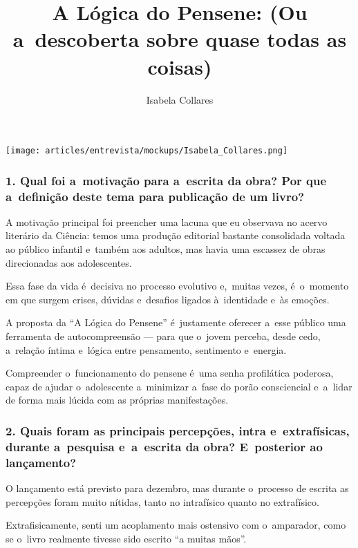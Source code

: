\documentclass{gescons}
\author{Isabela Collares}
\title{A Lógica do Pensene: (Ou a~descoberta sobre quase todas as coisas)}
\begin{document}
    \makeentrevistatitle

    \begin{multicols}{3}

\begin{center}
    \texttt{[image: articles/entrevista/mockups/Isabela\_Collares.png]}
\end{center}
\vspace{-1cm}


\subsubsection{1. Qual foi a~motivação para a~escrita da obra? Por que a~definição deste tema para publicação de um livro?}

\sloppy

A motivação principal foi preencher uma lacuna que eu observava no acervo literário da Ciência: temos uma produção editorial bastante consolidada voltada ao público infantil e~também aos adultos, mas havia uma escassez de obras direcionadas aos adolescentes.

\fussy

Essa fase da vida é~decisiva no processo evolutivo e,~muitas vezes, é~o~momento em que surgem crises, dúvidas e~desafios ligados à~identidade e~às emoções.

A proposta da ``A Lógica do Pensene'' é~justamente oferecer a~esse público uma ferramenta de autocompreensão --- para que o~jovem perceba, desde cedo, a~relação íntima e~lógica entre pensamento, sentimento e~energia.

Compreender o~funcionamento do pensene é~uma senha profilática poderosa, capaz de ajudar o~adolescente a~minimizar a~fase do porão consciencial e~a~lidar de forma mais lúcida com as próprias manifestações.


\subsubsection{2. Quais foram as principais percepções, intra e~extrafísicas, durante a~pesquisa e~a~escrita da obra? E~posterior ao lançamento?}

O lançamento está previsto para dezembro, mas durante o~processo de escrita as percepções foram muito nítidas, tanto no intrafísico quanto no extrafísico.

Extrafisicamente, senti um acoplamento mais ostensivo com o~amparador, como se o~livro realmente tivesse sido escrito ``a muitas mãos''.


\end{multicols}
\end{document}
